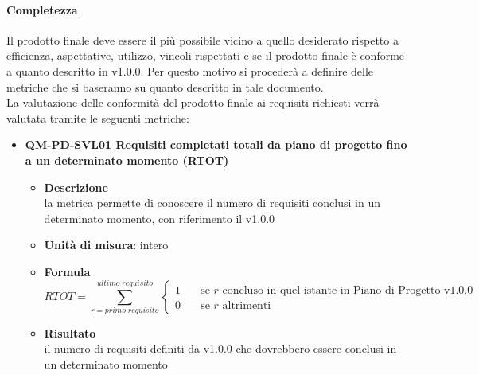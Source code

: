             \paragraph{Completezza}
                Il prodotto finale deve essere il più possibile vicino a quello desiderato rispetto a efficienza, aspettative, utilizzo, vincoli rispettati e se il prodotto finale è conforme a quanto descritto in  v1.0.0. Per questo motivo si procederà a definire delle metriche che si baseranno su quanto descritto in tale documento.\\
                La valutazione delle conformità del prodotto finale ai requisiti richiesti verrà valutata tramite le seguenti metriche:\\
                \begin{itemize}
                    \item\textbf{QM-PD-SVL01 Requisiti completati totali da piano di progetto fino a un determinato momento (RTOT)}
                        \begin{itemize}
                            \item\textbf{Descrizione}\\
                                la metrica permette di conoscere il numero di requisiti conclusi in un determinato momento, con riferimento il  v1.0.0\\
                            \item\textbf{Unità di misura}: intero
                            \item\textbf{Formula}\\
                                $$ \mathit{RTOT} = \sum_{r = \mathit{primo\;requisito}}^{\mathit{ultimo\;requisito}}
                                      \begin{cases}
                                            1       & \quad \text{se } r \text{ concluso in quel istante in Piano di Progetto v1.0.0}\\
                                            0  & \quad \text{se } r \text{ altrimenti}
                                      \end{cases}
                                $$
                            \item\textbf{Risultato}\\
                                il numero di requisiti definiti da  v1.0.0 che dovrebbero essere conclusi in un determinato momento
                                \newline

\end{itemize}
\end{itemize}

